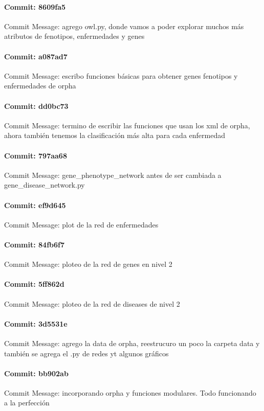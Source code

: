 \documentclass{article}
\begin{document}
\paragraph{Commit: 8609fa5}
Commit Message: agrego owl.py, donde vamos a poder explorar muchos más atributos de fenotipos, enfermedades y genes

\paragraph{Commit: a087ad7}
Commit Message: escribo funciones básicas para obtener genes fenotipos y enfermedades de orpha

\paragraph{Commit: dd0bc73}
Commit Message: termino de escribir las funciones que usan los xml de orpha, ahora también tenemos la clasificación más alta para cada enfermedad

\paragraph{Commit: 797aa68}
Commit Message: gene_phenotype_network antes de ser cambiada a gene_disease_network.py

\paragraph{Commit: ef9d645}
Commit Message: plot de la red de enfermedades

\paragraph{Commit: 84fb6f7}
Commit Message: ploteo de la red de genes en nivel 2

\paragraph{Commit: 5ff862d}
Commit Message: ploteo de la red de diseases de nivel 2

\paragraph{Commit: 3d5531e}
Commit Message: agrego la data de orpha, reestrucuro un poco la carpeta data y también se agrega el .py de redes yt algunos gráficos

\paragraph{Commit: bb902ab}
Commit Message: incorporando orpha y funciones modulares. Todo funcionando a la perfección
\end{document}
